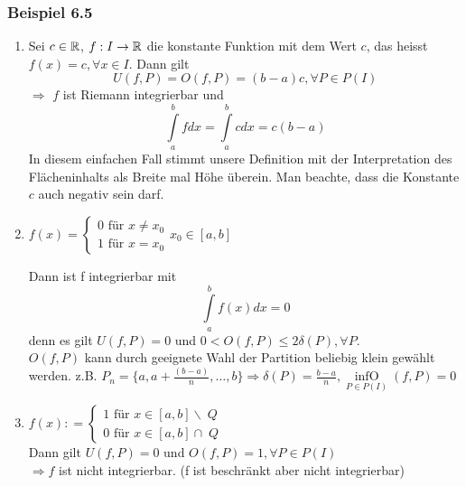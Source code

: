 \subsubsection*{Beispiel 6.5}
\begin{enumerate}[\indent 1)]
\item Sei $c\in \mathbb{R}$, $f:I\to \mathbb{R}$ die konstante Funktion mit dem Wert $c$, das heisst $f(x)=c, \forall x\in I$. Dann gilt \[U(f,P)=O(f,P)=(b-a)c, \forall P\in P(I)\] $\Rightarrow$ $f$ ist Riemann integrierbar und \[\int\limits_a^b {fdx}  = \int\limits_a^b {cdx = c(b - a)} \] In diesem einfachen Fall stimmt unsere Definition mit der Interpretation des Flächeninhalts als Breite mal Höhe überein. Man beachte, dass die Konstante $c$ auch negativ sein darf.
\item $f(x) = \left\{ {\begin{array}{*{20}{c}}
{0{\text{ für }}x \ne {x_0}}\\
{1{\text{ für }}x = {x_0}}
\end{array}} \right.{x_0} \in [a,b]$

\begin{center}
\end{center}



Dann ist f integrierbar mit \[\int\limits_a^b {f(x)dx = 0}\] denn es gilt $U(f,P)=0$ und $0<O(f,P) \leq 2\delta(P), \forall P$.\\

$O(f,P)$ kann durch geeignete Wahl der Partition beliebig klein gewählt werden. z.B. $P_n=\{a,a+\frac{{(b - a)}}{n},\dots,b\} \Rightarrow \delta (P)=\frac{b-a}{n}, \mathop {\inf O}\limits_{P \in P(I)}(f,P) = 0$

\item $f(x): = \left\{ {\begin{array}{*{20}{c}}
{1{\text{ für }}x \in [a,b]\backslash \;Q}\\
{0{\text{ für }}x \in [a,b] \cap \;Q}
\end{array}} \right.$
\\

Dann gilt $U(f,P)=0$ und $O(f,P)=1, \forall P\in P(I)$\\
$\Rightarrow f$ ist nicht integrierbar. (f ist beschränkt aber nicht integrierbar)
\end{enumerate}

